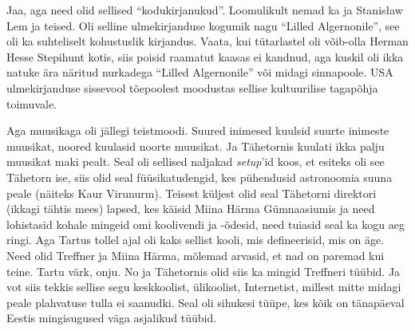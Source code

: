 
Jaa, aga need olid sellised \enquote{kodukirjanukud}. Loomulikult nemad 
ka ja Stanisław Lem ja teised. Oli selline ulmekirjanduse kogumik nagu \enquote{Lilled 
Algernonile}, see oli ka suhteliselt kohustuslik kirjandus. Vaata, kui 
tütarlastel oli võib-olla Herman Hesse Stepihunt kotis, siis poisid raamatut 
kaasas ei kandnud, aga kuskil oli ikka natuke ära näritud nurkadega \enquote{Lilled 
Algernonile} või midagi sinnapoole. USA ulmekirjanduse sissevool tõepoolest 
moodustas sellise kultuurilise tagapõhja toimuvale.

Aga muusikaga oli jällegi teistmoodi. Suured inimesed kuulsid suurte inimeste 
muusikat, noored kuulasid noorte muusikat. Ja Tähetornis  
kuulati ikka palju muusikat maki pealt. Seal oli sellised naljakad 
\emph{setup}'id koos, et esiteks oli see Tähetorn ise, siis olid seal 
füüsikatudengid, kes pühendusid astronoomia suuna peale (näiteks Kaur 
Virunurm). Teisest küljest olid seal Tähetorni 
direktori (ikkagi tähtis mees) lapsed, kes käisid Miina Härma 
Gümnaasiumis ja need lohistasid kohale 
mingeid omi koolivendi ja -õdesid, need tuiasid seal ka kogu aeg ringi. Aga 
Tartus tollel ajal oli kaks sellist kooli, mis  defineerisid, mis on äge. Need 
olid Treffner ja Miina Härma, mõlemad 
arvasid, et nad on paremad kui teine. Tartu värk, onju. No ja Tähetornis olid 
siis ka mingid Treffneri tüübid. Ja vot siis tekkis sellise segu keskkoolist, 
ülikoolist, Internetist, millest mitte midagi peale plahvatuse tulla ei 
saanudki. Seal oli sihukesi tüüpe, kes kõik on tänapäeval Eestis mingisugused 
väga asjalikud tüübid.


